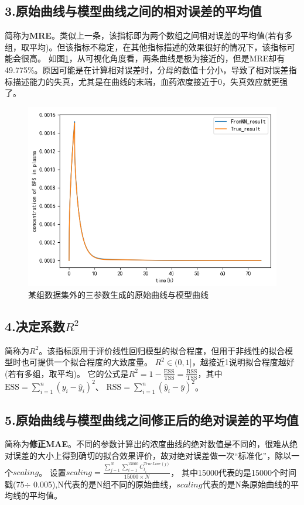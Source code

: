 \documentclass{article}
\begin{document}
\subsection*{3.原始曲线与模型曲线之间的相对误差的平均值}
简称为\textbf{MRE}。类似上一条，该指标即为两个数组之间相对误差的平均值(若有多组，取平均)。但该指标不稳定，在其他指标描述的效果很好的情况下，该指标可能会很高。
如图\ref{fig1}，从可视化角度看，两条曲线是极为接近的，但是MRE却有49.775\%。原因可能是在计算相对误差时，分母的数值十分小，导致了相对误差指标描述能力的失真，尤其是在曲线的末端，血药浓度接近于0，失真效应就更强了。
\begin{figure}[H]
    \centering
    \includegraphics[scale=0.4]{p1-1.png}
    \caption{某组数据集外的三参数生成的原始曲线与模型曲线}
    \label{fig1}
\end{figure}
\subsection*{4.决定系数$R^2$}
简称为\textbf{$R^2$}。该指标原用于评价线性回归模型的拟合程度，但用于非线性的拟合模型时也可提供一个拟合程度的大致度量。
$R^2\in(0,1]$，越接近1说明拟合程度越好(若有多组，取平均)。
它的公式是$ R^2 = 1 - \frac{\text{ESS}}{\text{TSS}} = \frac{\text{RSS}}{\text{TSS}}$，其中$\text{ESS} = \sum_{i=1}^{n} (y_i - \hat{y}_i)^2$、 
$ \text{RSS} = \sum_{i=1}^{n} (\hat{y}_i - \bar{y})^2 $。
\subsection*{5.原始曲线与模型曲线之间修正后的绝对误差的平均值}
简称为\textbf{修正MAE}。不同的参数计算出的浓度曲线的绝对数值是不同的，很难从绝对误差的大小上得到确切的拟合效果评价，故对绝对误差做一次“标准化”，除以一个$scaling$。
设置$scaling=\frac{\sum_{j = 1}^{N} \sum_{i = 1}^{15000} C^{TrueLine(j)}_{t_{i}}}{15000\times N}  $，
其中15000代表的是15000个时间戳(75$\div$ 0.005),N代表的是N组不同的原始曲线，$scaling$代表的是N条原始曲线的平均线的平均值。
\end{document}
